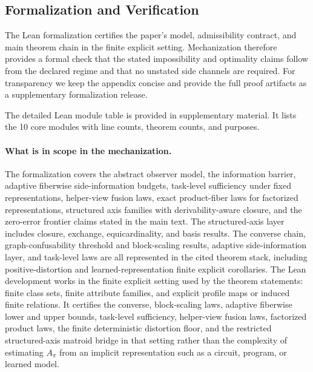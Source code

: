 \subsection{Formalization and Verification}\label{formalization-and-verification}

The Lean formalization certifies the paper's model, admissibility contract, and main theorem chain in the finite explicit setting. Mechanization therefore provides a formal check that the stated impossibility and optimality claims follow from the declared regime and that no unstated side channels are required. For transparency we keep the appendix concise and provide the full proof artifacts as a supplementary formalization release.

The detailed Lean module table is provided in supplementary material. It lists the 10 core modules with line counts, theorem counts, and purposes.

\paragraph{What is in scope in the mechanization.}
The formalization covers the abstract observer model, the information barrier, adaptive fiberwise side-information budgets, task-level sufficiency under fixed representations, helper-view fusion laws, exact product-fiber laws for factorized representations, structured axis families with derivability-aware closure, and the zero-error frontier claims stated in the main text. The structured-axis layer includes closure, exchange, equicardinality, and basis results. The converse chain, graph-confusability threshold and block-scaling results, adaptive side-information layer, and task-level laws are all represented in the cited theorem stack, including positive-distortion and learned-representation finite explicit corollaries. The Lean development works in the finite explicit setting used by the theorem statements: finite class sets, finite attribute families, and explicit profile maps or induced finite relations. It certifies the converse, block-scaling laws, adaptive fiberwise lower and upper bounds, task-level sufficiency, helper-view fusion laws, factorized product laws, the finite deterministic distortion floor, and the restricted structured-axis matroid bridge in that setting rather than the complexity of estimating $A_\pi$ from an implicit representation such as a circuit, program, or learned model. 

